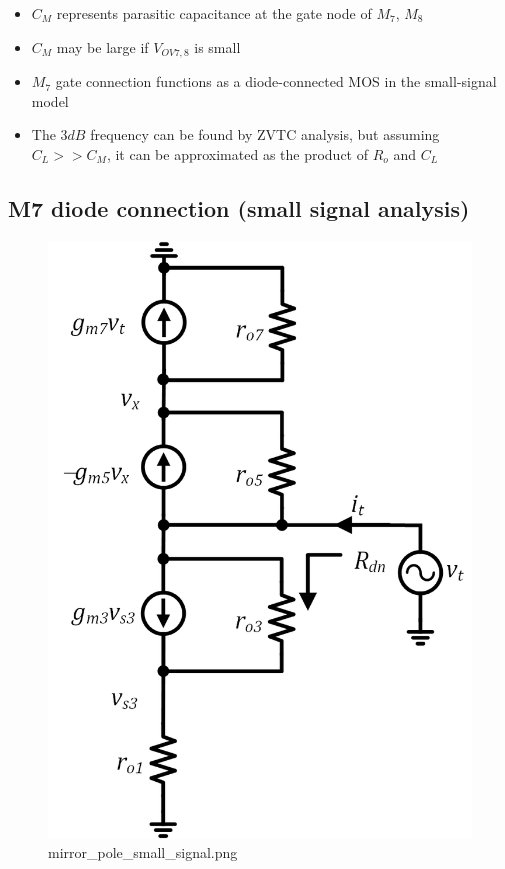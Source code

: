 \documentclass[11pt]{article}
\begin{document}
    \begin{itemize}
\item
  \(C_M\) represents parasitic capacitance at the gate node of \(M_7\),
  \(M_8\)
\item
  \(C_M\) may be large if \(V_{OV7,8}\) is small
\item
  \(M_7\) gate connection functions as a diode-connected MOS in the
  small-signal model
\item
  The \(3dB\) frequency can be found by ZVTC analysis, but assuming
  \(C_L >> C_M\), it can be approximated as the product of \(R_o\) and
  \(C_L\)
\end{itemize}

    \hypertarget{m7-diode-connection-small-signal-analysis}{%
\subsection{M7 diode connection (small signal
analysis)}\label{m7-diode-connection-small-signal-analysis}}

    \begin{figure}
\centering
\includegraphics{mirror_pole_small_signal.png}
\caption{mirror\_pole\_small\_signal.png}
\end{figure}
\end{document}

